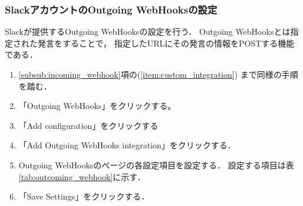 \documentclass[fleqn, 14pt]{extarticlej}
\begin{document}
\subsubsection{SlackアカウントのOutgoing WebHooksの設定}
Slackが提供するOutgoing WebHooksの設定を行う．
Outgoing WebHooksとは指定された発言をすることで，
指定したURLにその発言の情報をPOSTする機能である．
\label{subsub:outcoming_webhook}
\begin{enumerate}
\item \ref{subsub:incoming_webhook}項の(\ref{item:custom_integration})
  まで同様の手順を踏む．
\item 「Outgoing WebHooks」をクリックする。
\item 「Add configuration」をクリックする
\item 「Add Outgoing WebHooks integration」をクリックする．
\item Outgoing WebHooksのページの各設定項目を設定する．
  設定する項目は表\ref{tab:outcoming_webhook}に示す．
\item「Save Settings」をクリックする．
\end{enumerate}


\begin{table}[bt]
  \begin{center}
    \caption{Outgoing WebHooksの設定項目} 
    \label{tab:outcoming_webhook}
    \vspace{0.3cm}
  \end{center}
\end{table}
\end{document}
